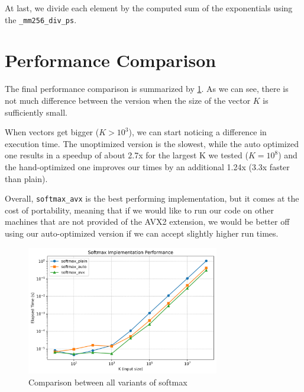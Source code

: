 \documentclass[12pt,a4paper]{article}
\begin{document}
At last, we divide each element by the computed sum of the exponentials using the \texttt{\_mm256\_div\_ps}.

\section{Performance Comparison}
The final performance comparison is summarized by \cref{fig:comparison}. As we can see, there is not much difference between the version when the size of the vector $K$ is sufficiently small. 

When vectors get bigger ($K > 10^3$), we can start noticing a difference in execution time. The unoptimized version is the slowest, while the auto optimized one results in a speedup of about 2.7x for the largest K we tested ($K = 10^{8}$) and the hand-optimized one improves our times by an additional 1.24x (3.3x faster than plain).

Overall, \texttt{softmax\_avx} is the best performing implementation, but it comes at the cost of portability, meaning that if we would like to run our code on other machines that are not provided of the AVX2 extension, we would be better off using our auto-optimized version if we can accept slightly higher run times.


\begin{figure}[h]
    \centering
    \includegraphics[width=0.75\textwidth]{notebooks/rep1_softmax_performance.png} 
    \caption{Comparison between all variants of softmax}   
    \label{fig:comparison}
\end{figure}
\end{document}
